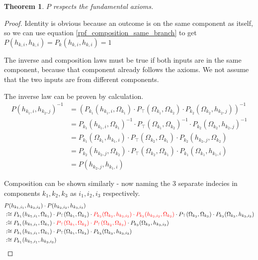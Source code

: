 \documentclass[twoside]{article}
\theoremstyle{plain}%
\newtheorem{theorem}{Theorem}[section]
\theoremstyle{definition}
\theoremstyle{remark}
\begin{document}
\begin{theorem}
\(P\) respects the fundamental axioms.
\end{theorem}

\begin{proof}
Identity is obvious because an outcome is on the same component as itself, so we can use equation \ref{rpf_composition_same_branch} to get \(P(h_{k, i}, h_{k, i}) = P_k(h_{k, i}, h_{k, i}) = 1\)

The inverse and composition laws must be true if both inputs are in the same component, because that component already follows the axioms. We not assume that the two inputs are from different components.

The inverse law can be proven by calculation.
\begin{equation}
\begin{aligned}
P(h_{k_1, i}, h_{k_2, j})^{-1} &= (P_{k_1}(h_{k_1, i}, \Omega_{k_1}) \cdot  P_{\top}(\Omega_{k_1}, \Omega_{k_2}) \cdot P_{k_2}(\Omega_{k_2}, h_{k_2, j}))^{-1} \\
& = P_{k_1}(h_{k_1, i}, \Omega_{k_1})^{-1} \cdot  P_{\top}(\Omega_{k_1}, \Omega_{k_2})^{-1} \cdot P_{k_2}(\Omega_{k_2}, h_{k_2, j})^{-1} \\
& = P_{k_1}(\Omega_{k_1}, h_{k_1, i}) \cdot  P_{\top}(\Omega_{k_2}, \Omega_{k_1}) \cdot P_{k_2}(h_{k_2, j}, \Omega_{k_2}) \\
& = P_{k_2}(h_{k_2, j}, \Omega_{k_2})\cdot  P_{\top}(\Omega_{k_2}, \Omega_{k_1}) \cdot P_{k_1}(\Omega_{k_1}, h_{k_1, i}) \\
& = P(h_{k_2, j}, h_{k_1, i})
\end{aligned}
\end{equation}

Composition can be shown similarly - now naming the 3 separate indecies in components \(k_1, k_2, k_3\) as \(i_1, i_2, i_3\) respectively.
\begin{equation}
\begin{aligned}
& P(h_{k_1, i_1}, h_{k_2, i_2}) \cdot P(h_{k_2, i_2}, h_{k_3, i_3}) \\
& :\cong P_{k_1}(h_{k_1, i_1}, \Omega_{k_1}) \cdot  P_{\top}(\Omega_{k_1}, \Omega_{k_2}) \cdot \textcolor{red}{P_{k_2}(\Omega_{k_2}, h_{k_2, i_2}) \cdot  P_{k_2}(h_{k_2, i_2}, \Omega_{k_2})} \cdot  P_{\top}(\Omega_{k_2}, \Omega_{k_3}) \cdot P_{k_3}(\Omega_{k_3}, h_{k_3, i_3}) \\
& :\cong P_{k_1}(h_{k_1, i_1}, \Omega_{k_1}) \cdot  \textcolor{red}{P_{\top}(\Omega_{k_1}, \Omega_{k_2}) \cdot  P_{\top}(\Omega_{k_2}, \Omega_{k_3})} \cdot P_{k_3}(\Omega_{k_3}, h_{k_3, i_3}) \\
& :\cong P_{k_1}(h_{k_1, i_1}, \Omega_{k_1}) \cdot  P_{\top}(\Omega_{k_1}, \Omega_{k_3}) \cdot P_{k_3}(\Omega_{k_3}, h_{k_3, i_3}) \\
& :\cong P_{k_1}(h_{k_1, i_1}, h_{k_3, i_3})
\end{aligned}
\end{equation}
\end{proof}
\end{document}

